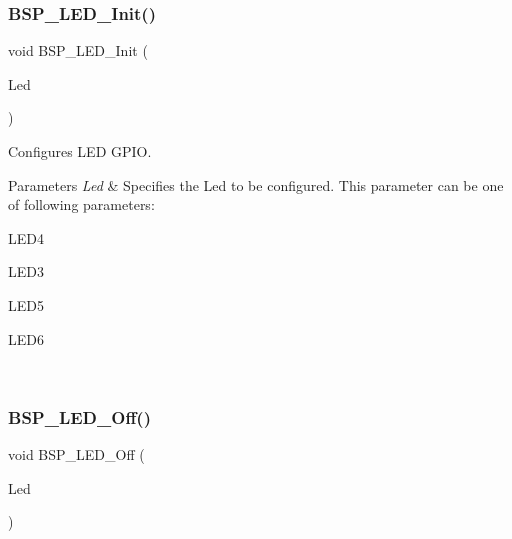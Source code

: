 \subsubsection{\texorpdfstring{B\+S\+P\+\_\+\+L\+E\+D\+\_\+\+Init()}{BSP\_LED\_Init()}}
{\footnotesize\ttfamily void B\+S\+P\+\_\+\+L\+E\+D\+\_\+\+Init (\begin{DoxyParamCaption}\item[{Led\+\_\+\+Type\+Def}]{Led }\end{DoxyParamCaption})}



Configures L\+ED G\+P\+IO. 


\begin{DoxyParams}{Parameters}
{\em Led} & Specifies the Led to be configured. This parameter can be one of following parameters\+: \begin{DoxyItemize}
\item L\+E\+D4 \item L\+E\+D3 \item L\+E\+D5 \item L\+E\+D6 \end{DoxyItemize}
\\
\hline
\end{DoxyParams}
\mbox{\label{group___s_t_m32_f4___d_i_s_c_o_v_e_r_y___l_o_w___l_e_v_e_l___l_e_d___functions_gaef268680154ca15c45066d64d41f9467}} 
\subsubsection{\texorpdfstring{B\+S\+P\+\_\+\+L\+E\+D\+\_\+\+Off()}{BSP\_LED\_Off()}}
{\footnotesize\ttfamily void B\+S\+P\+\_\+\+L\+E\+D\+\_\+\+Off (\begin{DoxyParamCaption}\item[{Led\+\_\+\+Type\+Def}]{Led }\end{DoxyParamCaption})}




